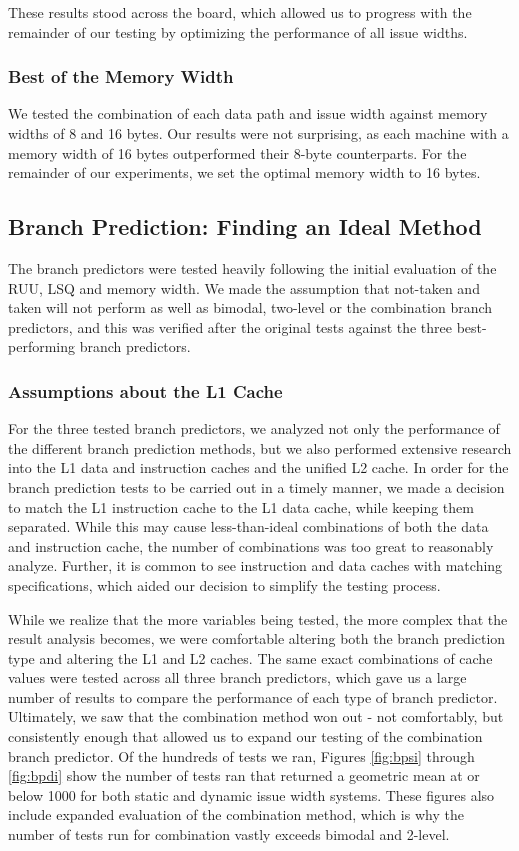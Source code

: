 \documentclass[paper=a4, fontsize=12pt]{scrartcl} %
\numberwithin{equation}{section} %
\numberwithin{figure}{section} %
\numberwithin{table}{section} %
\begin{document}
These results stood across the board, which allowed us to progress with the remainder of our testing by optimizing the performance of all issue widths.

\subsubsection{Best of the Memory Width}

We tested the combination of each data path and issue width against memory widths of 8 and 16 bytes. Our results were not surprising, as each machine with a memory width of 16 bytes outperformed their 8-byte counterparts. For the remainder of our experiments, we set the optimal memory width to 16 bytes.


\subsection{Branch Prediction: Finding an Ideal Method}

The branch predictors were tested heavily following the initial evaluation of the RUU, LSQ and memory width. We made the assumption that not-taken and taken will not perform as well as bimodal, two-level or the combination branch predictors, and this was verified after the original tests against the three best-performing branch predictors.

\subsubsection{Assumptions about the L1 Cache}

For the three tested branch predictors, we analyzed not only the performance of the different branch prediction methods, but we also performed extensive research into the L1 data and instruction caches and the unified L2 cache. In order for the branch prediction tests to be carried out in a timely manner, we made a decision to match the L1 instruction cache to the L1 data cache, while keeping them separated. While this may cause less-than-ideal combinations of both the data and instruction cache, the number of combinations was too great to reasonably analyze. Further, it is common to see instruction and data caches with matching specifications, which aided our decision to simplify the testing process.

While we realize that the more variables being tested, the more complex that the result analysis becomes, we were comfortable altering both the branch prediction type and altering the L1 and L2 caches. The same exact combinations of cache values were tested across all three branch predictors, which gave us a large number of results to compare the performance of each type of branch predictor. Ultimately, we saw that the combination method won out - not comfortably, but consistently enough that allowed us to expand our testing of the combination branch predictor. Of the hundreds of tests we ran, Figures \ref{fig:bpsi} through \ref{fig:bpdi} show the number of tests ran that returned a geometric mean at or below 1000 for both static and dynamic issue width systems. These figures also include expanded evaluation of the combination method, which is why the number of tests run for combination vastly exceeds bimodal and 2-level.
\end{document}
